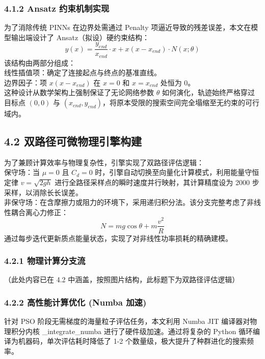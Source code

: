 \documentclass[twocolumn, 12pt]{article} %
\begin{document}
	\subsubsection{4.1.2 Ansatz 约束机制实现}
	为了消除传统 PINNs 在边界处需通过 Penalty 项逼近导致的残差误差，本文在模型输出端设计了 Ansatz（拟设）硬约束结构：
	\begin{equation}
		y(x) = \frac{y_{end}}{x_{end}} \cdot x + x(x - x_{end}) \cdot N(x; \theta)
	\end{equation}
	该结构由两部分组成：\\
	线性插值项：确定了连接起点与终点的基准直线。\\
	边界因子：项 $x(x - x_{end})$ 在 $x=0$ 和 $x=x_{end}$ 处恒为 0。\\
	这种设计从数学架构上强制保证了无论网络参数 $\theta$ 如何演化，轨迹始终严格穿过目标点 $(0,0)$ 与 $(x_{end}, y_{end})$，将原本受限的搜索空间完全塌缩至无约束的可行域内。
	
	\subsection{4.2 双路径可微物理引擎构建}
	为了兼顾计算效率与物理复杂性，引擎实现了双路径评估逻辑：\\
	保守场：当 $\mu=0$ 且 $C_d=0$ 时，引擎自动切换至向量化计算模式，利用能量守恒定律 $v=\sqrt{2gh}$ 进行全路径采样点的瞬时速度并行映射，其计算精度设为 2000 步采样，以消除长长误差。\\
	非保守场：在含摩擦力或阻力的环境下，采用递归积分法。该分支完整考虑了非线性耦合离心力修正：
	\begin{equation}
		N = mg\cos\theta + m\frac{v^2}{R}
	\end{equation}
	通过每步迭代更新质点能量状态，实现了对非线性功率损耗的精确建模。
	
	\subsubsection{4.2.1 物理计算分支流}
	（此处内容已在 4.2 中涵盖，按照图片结构，此标题下为双路径评估逻辑）
	
	\subsubsection{4.2.2 高性能计算优化 (Numba 加速)}
	针对 PSO 阶段无需梯度的海量粒子评估任务，本文利用 Numba JIT 编译器对物理积分内核 \_integrate\_numba 进行了硬件级加速。通过将复杂的 Python 循环编译为机器码，单次评估耗时降低了 1-2 个数量级，极大提升了种群进化的搜索频率。
	
\end{document}
